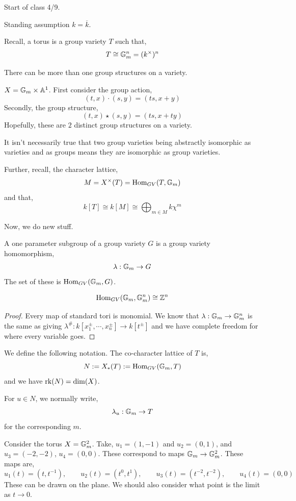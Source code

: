 \documentclass[12pt]{amsart}
\begin{document}
Start of class 4/9. 

Standing assumption $k = \overline{k}$. 

Recall, a torus is a group variety $T$ such that, 
\[ T \cong \mathbb G_m^n = (k^\times)^n\]

There can be more than one group structures on a variety. 
\begin{example}
    $X = \mathbb G_m \times \mathbb A^1$. First consider the group action, 
    \[ (t, x) \cdot (s, y) = (ts, x+y) \]
    Secondly, the group structure, 
    \[ (t, x) \star (s,y) = (ts, x+ty) \]
    Hopefully, these are $2$ distinct group structures on a variety. 
\end{example}
It isn't necessarily true that two group varieties being abstractly isomorphic as varieties and as groups means they are isomorphic as group varieties. 


Further, recall, the character lattice, 
\[ M = X^\times(T) = \operatorname{Hom}_{GV}(T, \mathbb G_m)\]
and that, 
\[ k[T] \cong k[M] \cong \bigoplus_{m \in M} k\chi^m\]

Now, we do new stuff. 
\begin{definition}
    A one parameter subgroup of a group variety $G$ is a group variety homomorphism, 
    \[ \lambda: \mathbb G_m \to G\]
    The set of these is $\operatorname{Hom}_{GV}(\mathbb G_m, G)$. 
\end{definition}

\begin{lemma}
    \[ \operatorname{Hom}_{GV}(\mathbb G_m, \mathbb G_m^n) \cong \mathbb Z^n \]
\end{lemma}
\begin{proof}
    Every map of standard tori is monomial. We know that $\lambda: \mathbb G_m \to \mathbb G_m^n$ is the same as giving $\lambda^\#: k[x_1^\pm, \cdots, x_n^\pm] \to k[t^\pm]$ and we have complete freedom for where every variable goes.     
\end{proof}

We define the following notation. The co-character lattice of $T$ is, 
\[ N := X_*(T) := \operatorname{Hom}_{GV}(\mathbb G_m, T)\]
and we have $\operatorname{rk}(N) = \dim(X)$. 

For $u \in N$, we normally write, 
\[ \lambda_u: \mathbb G_m \to T\]
for the corresponding $m$. 

\begin{example}
    Consider the torus $X = \mathbb G_m^2$. Take, $u_1 = (1, -1)$ and $u_2 = (0, 1)$, and $u_3 = (-2, -2)$, $u_4 = (0, 0)$. These correspond to maps $\mathbb G_m \to \mathbb G_m^2$. These maps are, 
    \[ u_1(t) = (t, t^{-1}), \qquad u_2(t) = (t^0, t^1), \qquad u_3(t) = (t^{-2}, t^{-2}), \qquad u_4(t) = (0, 0)\]
    These can be drawn on the plane. We should also consider what point is the limit as $t \to 0$. 
\end{example}
\end{document}
